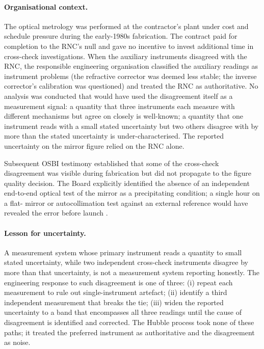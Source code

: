 \paragraph{Organisational context.}
The optical metrology was performed at the contractor's plant
under cost and schedule pressure during the early-1980s
fabrication. The contract paid for completion to the RNC's null
and gave no incentive to invest additional time in cross-check
investigations. When the auxiliary instruments disagreed with the
RNC, the responsible engineering organisation classified the
auxiliary readings as instrument problems (the refractive
corrector was deemed less stable; the inverse corrector's
calibration was questioned) and treated the RNC as authoritative.
No analysis was conducted that would have used the disagreement
itself as a measurement signal: a quantity that three instruments
each measure with different mechanisms but agree on closely is
well-known; a quantity that one instrument reads with a small
stated uncertainty but two others disagree with by more than the
stated uncertainty is under-characterised. The reported uncertainty
on the mirror figure relied on the RNC alone.

Subsequent OSBI testimony established that some of the cross-check
disagreement was visible during fabrication but did not propagate
to the figure quality decision. The Board explicitly identified
the absence of an independent end-to-end optical test of the
mirror as a precipitating condition; a single hour on a flat-
mirror or autocollimation test against an external reference
would have revealed the error before launch
\cite{acc:nasa-hubble-optical-systems-1990}.

\paragraph{Lesson for uncertainty.}
A measurement system whose primary instrument reads a quantity to
small stated uncertainty, while two independent cross-check
instruments disagree by more than that uncertainty, is not a
measurement system reporting honestly. The engineering response
to such disagreement is one of three: (i) repeat each measurement
to rule out single-instrument artefact; (ii) identify a third
independent measurement that breaks the tie; (iii) widen the
reported uncertainty to a band that encompasses all three
readings until the cause of disagreement is identified and
corrected. The Hubble process took none of these paths; it
treated the preferred instrument as authoritative and the
disagreement as noise.

